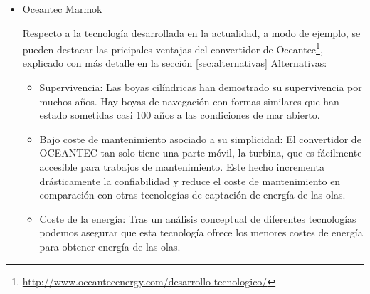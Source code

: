\begin{itemize}
  En 2015, produjo el 98,95\% de su electricidad con energías
  renovables \cite{isola15}, como especificó Carlos Obregón Quesada, presidente
  ejecutivo del ICE, el reparto exacto de la producción fue la
  siguiente: energía hidroeléctrica (75,53\%), geotérmica (12,88\%),
  eólica (9,81\%), biomasa (0,72\%), solar (0,01\%) y combustibles
  fósiles (1,05\%).

  Desde mayo del 2016, el 100\% de la energía en Costa Rica es de
  fuentes renovables. Según el presidente ejecutivo del ICE, la
  expectativa es concluir el año con al menos un 98\% de generación
  eléctrica a partir de fuentes renovables \cite{afp}.
  
\item
  Oceantec Marmok

  Respecto a la tecnología desarrollada en la actualidad, a modo de
  ejemplo, se pueden destacar las pricipales ventajas del convertidor de Oceantec\footnote{\url{http://www.oceantecenergy.com/desarrollo-tecnologico/}},
  explicado con más detalle en la sección \autoref{sec:alternativas} 
  Alternativas:

  \begin{itemize}
  \item
    Supervivencia: Las boyas cilíndricas han demostrado su supervivencia
    por muchos años. Hay boyas de navegación con formas similares que
    han estado sometidas casi 100 años a las condiciones de mar abierto.
  \item
    Bajo coste de mantenimiento asociado a su simplicidad: El
    convertidor de OCEANTEC tan solo tiene una parte móvil, la turbina,
    que es fácilmente accesible para trabajos de mantenimiento. Este
    hecho incrementa drásticamente la confiabilidad y reduce el coste de
    mantenimiento en comparación con otras tecnologías de captación de
    energía de las olas.
  \item
    Coste de la energía: Tras un análisis conceptual de diferentes
    tecnologías podemos asegurar que esta tecnología ofrece los menores
    costes de energía para obtener energía de las olas.
  \end{itemize}
\end{itemize}
